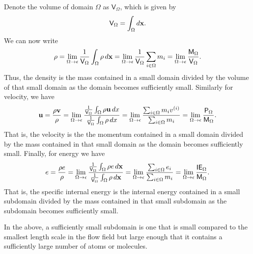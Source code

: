 \documentclass[a4paper,11pt]{report}
\begin{document}
Denote the volume of domain $\Omega$ as $\mathsf{V}_\Omega$, which is given by
\begin{equation}
    \mathsf{V}_\Omega = \int_\Omega d\mathbf{x}.
\end{equation}
We can now write
\begin{equation}
    \label{eq:atomistic_rho}
    \rho = \lim_{\Omega \to \epsilon} \frac{1}{\mathsf{V}_\Omega} \int_\Omega \rho \, d\mathbf{x} = \lim_{\Omega \to \epsilon} \frac{1}{\mathsf{V}_\Omega} \sum_{i \in \Omega} m_i = \lim_{\Omega \to \epsilon} \frac{ \mathsf{M}_\Omega }{ \mathsf{V}_\Omega }.
\end{equation}
Thus, the density is the mass contained in a small domain divided by the volume of that small domain as the domain becomes sufficiently small. Similarly for velocity, we have
\begin{equation}
    \label{eq:atomistic_u}
    \mathbf{u} = \frac{\rho\mathbf{v}}{\rho} = \lim_{\Omega \to \epsilon} \frac{\frac{1}{\mathsf{V}_\Omega} \int_\Omega \rho \mathbf{u} \, dx}{\frac{1}{\mathsf{V}_\Omega} \int_\Omega \rho \, dx} = \lim_{\Omega \to \epsilon} \frac{ \sum_{i \in \Omega} m_i v^{(i)} }{ \sum_{i \in \Omega} m_i } = \lim_{\Omega \to \epsilon} \frac{ \mathsf{P}_\Omega }{ \mathsf{M}_\Omega }.
\end{equation}
That is, the velocity is the the momentum contained in a small domain divided by the mass contained in that small domain as the domain becomes sufficiently small. Finally, for energy we have
\begin{equation}
    \label{eq:atomistic_e}
    e = \frac{\rho e}{\rho} = \lim_{\Omega \to \epsilon} \frac{ \frac{1}{\mathsf{V}_\Omega} \int_\Omega \rho e \, d\mathbf{x}}{ \frac{1}{\mathsf{V}_\Omega} \int_\Omega \rho \, d\mathbf{x}} = \lim_{\Omega \to \epsilon} \frac{ \sum_{i \in \Omega} e_i }{ \sum_{i \in \Omega} m_i } = \lim_{\Omega \to \epsilon} \frac{ \mathsf{IE}_\Omega }{ \mathsf{M}_\Omega }.
\end{equation}
That is, the specific internal energy is the internal energy contained in a small subdomain divided by the mass contained in that small subdomain as the subdomain becomes sufficiently small.

In the above, a sufficiently small subdomain is one that is small compared to the smallest length scale in the flow field but large enough that it contains a sufficiently large number of atoms or molecules.
\end{document}
